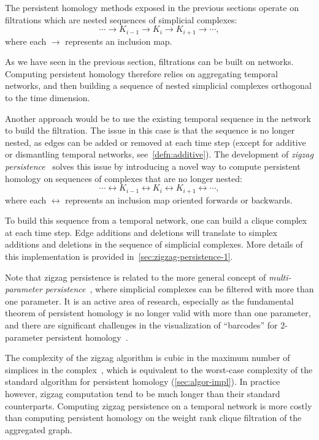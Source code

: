 \documentclass[a4paper,11pt,openany,extrafontsizes]{memoir}
\begin{document}
The persistent homology methods exposed in the previous sections
operate on filtrations which are nested sequences of simplicial
complexes:
\[ \cdots \longrightarrow K_{i-1} \longrightarrow K_i \longrightarrow
  K_{i+1} \longrightarrow \cdots, \] where each $\longrightarrow$
represents an inclusion map.

As we have seen in the previous section, filtrations can be built on
networks. Computing persistent homology therefore relies on
aggregating temporal networks, and then building a sequence of nested
simplicial complexes orthogonal to the time dimension.

Another approach would be to use the existing temporal sequence in the
network to build the filtration. The issue in this case is that the
sequence is no longer nested, as edges can be added or removed at each
time step (except for additive or dismantling temporal networks,
see~\autoref{defn:additive}). The development of \emph{zigzag
  persistence}~\cite{carlsson_zigzag_2008, carlsson_zigzag_2009}
solves this issue by introducing a novel way to compute persistent
homology on sequences of complexes that are no longer nested:
\[ \cdots \longleftrightarrow K_{i-1} \longleftrightarrow K_i
  \longleftrightarrow K_{i+1} \longleftrightarrow \cdots, \] where
each $\longleftrightarrow$ represents an inclusion map oriented
forwards or backwards.

To build this sequence from a temporal network, one can build a clique
complex at each time step. Edge additions and deletions will translate
to simplex additions and deletions in the sequence of simplicial
complexes. More details of this implementation is provided
in~\autoref{sec:zigzag-persistence-1}.

Note that zigzag persistence is related to the more general concept of
\emph{multi-parameter persistence}~\cite{carlsson_theory_2009,
  dey_computing_2014}, where simplicial complexes can be filtered with
more than one parameter. It is an active area of research, especially
as the fundamental theorem of persistent homology is no longer valid
with more than one parameter, and there are significant challenges in
the visualization of ``barcodes'' for 2-parameter persistent
homology~\cite{otter_roadmap_2017}.

The complexity of the zigzag algorithm is cubic in the maximum number
of simplices in the complex~\cite{carlsson_zigzag_2009}, which is
equivalent to the worst-case complexity of the standard algorithm for
persistent homology (\autoref{sec:algor-impl}). In practice however,
zigzag computation tend to be much longer than their standard
counterparts. Computing zigzag persistence on a temporal network is
more costly than computing persistent homology on the weight rank
clique filtration of the aggregated graph.
\end{document}
